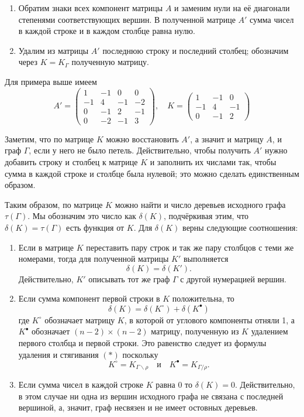 \documentclass{article}
\begin{document}
\begin{enumerate}
\item Обратим знаки всех компонент матрицы $A$ и заменим нули на её диагонали степенями соответствующих вершин. 
В полученной матрице $A'$ сумма чисел в каждой строке и в каждом столбце равна нулю. 
\item Удалим из матрицы $A'$ последнюю строку и последний столбец;
обозначим через $K=K_\Gamma$ полученную матрицу.
\end{enumerate}

Для примера выше имеем
\[A'=\left(
\begin{matrix}
1&-1&0&0
\\
-1&4&-1&-2
\\
0&-1&2&-1
\\
0&-2&-1&3
\end{matrix}
\right),
\quad 
K=\left(
\begin{matrix}
1&-1&0
\\
-1&4&-1
\\
0&-1&2
\end{matrix}
\right)\]

Заметим, что по матрице $K$ можно восстановить $A'$, а значит и матрицу $A$, и граф $\Gamma$, если у него не было петель.
Действительно, чтобы получить $A'$ нужно добавить строку и столбец к матрице $K$ и заполнить их числами так, чтобы сумма в каждой строке и столбце была нулевой;
это можно сделать единственным образом.

Таким образом, по матрице $K$ можно найти и число деревьев исходного графа $\tau(\Gamma)$.
Мы обозначим это число как $\delta(K)$, подчёркивая этим, что $\delta(K)=\tau(\Gamma)$ есть функция от $K$.
Для $\delta(K)$ верны следующие соотношения:
\begin{enumerate}
\item Если в матрице $K$ переставить пару строк и так же пару столбцов с теми же номерами,
тогда для полученной матрицы $K'$ выполняется 
\[\delta(K)=\delta(K').\]
Действительно, $K'$ описывать тот же граф $\Gamma$ с другой нумерацией вершин.
\item 
Если сумма компонент первой строки в $K$ положительна, то
\[\delta(K)=\delta(K^{\circ})+\delta(K^{\bullet})\]
где $K^{\circ}$ обозначает матрицу $K$, в которой от углового компоненты отняли 1, а $K^{\bullet}$ обозначает $(n-2)\times(n-2)$ матрицу, полученную из $K$ удалением первого столбца и первой строки.
Это равенство следует из формулы удаления и стягивания $({*})$ поскольку \[K^{\circ}=K_{\Gamma\backslash\rho}\quad\text{и}\quad K^{\bullet}=K_{\Gamma/\rho}.\]
\item Если сумма чисел в каждой строке $K$ равна $0$ то $\delta(K)=0$. 
Действительно, в этом случае ни одна из вершин исходного графа не связана с последней вершиной, а, значит, граф несвязен и не имеет остовных деревьев.
\end{enumerate}
\end{document}
